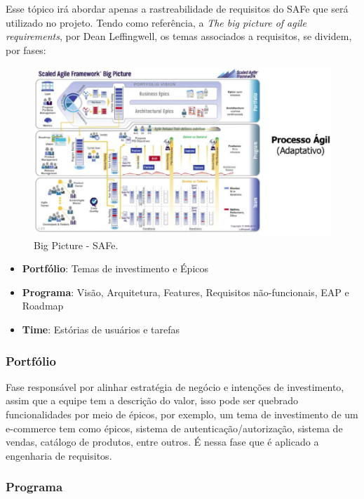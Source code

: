 Esse tópico irá abordar apenas a rastreabilidade de requisitos do SAFe que será utilizado no projeto. Tendo como referência, a \textit{The big picture of agile requirements}, por Dean Leffingwell, os temas associados a requisitos, se dividem, por fases:

\begin{figure}[h!]
	\centering
  \includegraphics[keepaspectratio=true,scale=0.5]{figuras/safe.eps}
  \caption{Big Picture - SAFe. \cite{safe}}
	\label{fig:safe}
\end{figure}

\begin{itemize}
  \item \textbf{Portfólio}: Temas de investimento e Épicos
  \item \textbf{Programa}: Visão, Arquitetura, Features, Requisitos não-funcionais, EAP e Roadmap
  \item \textbf{Time}: Estórias de usuários e tarefas
\end{itemize}

\subsubsection{Portfólio}

Fase responsável por alinhar estratégia de negócio e intenções de investimento, assim que a equipe tem a descrição do valor, isso pode ser quebrado funcionalidades por meio de épicos, por exemplo, um tema de investimento de um e-commerce tem como épicos, sistema de autenticação/autorização, sistema de vendas, catálogo de produtos, entre outros. É nessa fase que é aplicado a engenharia de requisitos.

\subsubsection{Programa}

